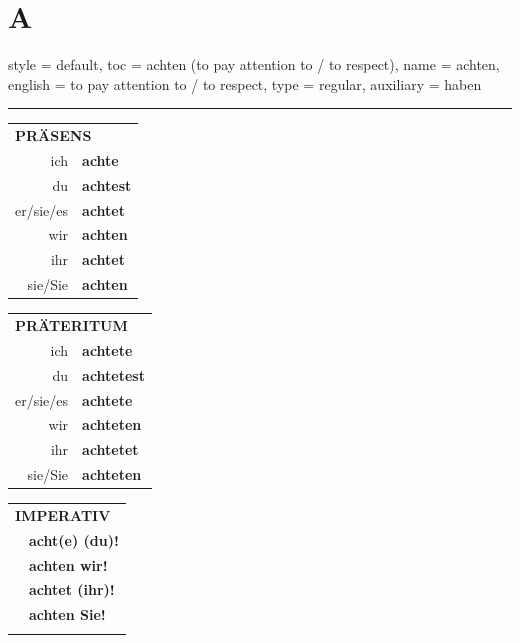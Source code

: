 \section{A}

\begin{verbentry}{
  style = {default},
  toc = {achten (to pay attention to / to respect)},
  name = {achten},
  english = {to pay attention to / to respect},
  type = {regular},
  auxiliary = {haben}
}
 
    
     \vspace{5pt}

    \hrule
    
    \vspace{5pt}

  \begin{tabular}{rl}
     \multicolumn{2}{l}{\textbf{PRÄSENS} }\\
    ich & \textbf{achte}\\
    du & \textbf{achtest}\\
    er/sie/es & \textbf{achtet}\\
    wir & \textbf{achten}\\
    ihr & \textbf{achtet}\\
    sie/Sie & \textbf{achten}\\
  \end{tabular}
  \hfill
     \begin{tabular}{rl}
    \multicolumn{2}{l}{\textbf{PRÄTERITUM} }\\
    ich & \textbf{achtete}\\
    du & \textbf{achtetest}\\
    er/sie/es & \textbf{achtete}\\
    wir & \textbf{achteten}\\
    ihr & \textbf{achtetet}\\
    sie/Sie & \textbf{achteten}\\
  \end{tabular}
  \hfill
  \begin{tabular}{rl}
     \multicolumn{2}{l}{\textbf{IMPERATIV} }\\
   & \textbf{acht(e) (du)!}\\
   & \textbf{achten wir!}\\
   & \textbf{achtet (ihr)!}\\
   & \textbf{achten Sie!}\\
   & \vspace{10pt}
  \end{tabular}


\end{verbentry}
